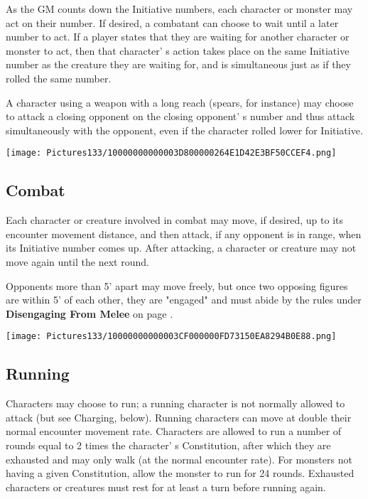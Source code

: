 \documentclass[a4paper,twoside,openany,10pt]{book}
\begin{document}
\begin{multicols}{2}
As the GM counts down the Initiative numbers, each character or monster may act on their number. If desired, a combatant can choose to wait until a later number to act. If a player states that they are waiting for another character or monster to act, then that character' s action takes place on the same Initiative number as the creature they are waiting for, and is simultaneous just as if they rolled the same number.

A character using a weapon with a long reach (spears, for instance) may choose to attack a closing opponent on the closing opponent' s number and thus attack simultaneously with the opponent, even if the character rolled lower for Initiative.

\begin{flushleft}
	\texttt{[image: Pictures133/10000000000003D800000264E1D42E3BF50CCEF4.png]}
\end{flushleft}

\subsection{Combat}\label{combat}

Each character or creature involved in combat may move, if desired, up to its encounter movement distance, and then attack, if any opponent is in range, when its Initiative number comes up. After attacking, a character or creature may not move again until the next round.

Opponents more than 5' apart may move freely, but once
two opposing figures are within 5' of each other, they
are "engaged" and must abide by the rules under \textbf{Disengaging From
Melee }on page \hyperlink{disengaging-from-melee}{\pageref{disengaging-from-melee}}.

\begin{flushleft}
	\texttt{[image: Pictures133/10000000000003CF000000FD73150EA8294B0E88.png]}
\end{flushleft}

\subsection{Running}\label{running}

Characters may choose to run; a running character is not normally allowed to attack (but see Charging, below). Running characters can move at double their normal encounter movement rate. Characters are allowed to run a number of rounds equal to 2 times the character' s Constitution, after which they are exhausted and may only walk (at the normal encounter rate). For monsters not having a given Constitution, allow the monster to run for 24 rounds. Exhausted characters or creatures must rest for at least a turn before running again.


\end{multicols}
\end{document}
